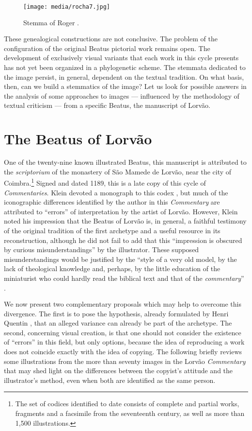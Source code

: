 \begin{paper}
\begin{figure}[H]
    \centering
    \texttt{[image: media/rocha7.jpg]}
    \caption{Stemma of Roger \citet{gryson_beati_2012}.}
    \label{fig:rocha:gryson}
\end{figure}

These genealogical constructions are not conclusive. The problem of the
configuration of the original Beatus pictorial work remains open. The
development of exclusively visual variants that each work in this cycle
presents has not yet been organized in a phylogenetic scheme. The
stemmata dedicated to the image persist, in general, dependent on
the textual tradition. On what basis, then, can we build a stemmatics of
the image? Let us look for possible answers in the analysis of some
approaches to images –– influenced by the methodology of textual
criticism –– from a specific Beatus, the manuscript of Lorvão.

\section*{The Beatus of Lorvão}

One of the twenty-nine known illustrated Beatus, this manuscript is
attributed to the \emph{scriptorium} of the monastery of São Mamede de
Lorvão, near the city of Coimbra.\footnote{The set of codices identified
  to date consists of complete and partial works, fragments and a
  facsimile from the seventeenth century, as well as more than 1,500
  illustrations.} Signed and dated 1189, this is a late copy of this
cycle of \emph{Commentaries}. Klein devoted a monograph to this codex \citep{klein_beato_2004}, but much of the iconographic differences identified by the
author in this \emph{Commentary} are attributed to ``errors'' of
interpretation by the artist of Lorvão. However, Klein noted his
impression that the Beatus of Lorvão is, in general, a faithful
testimony of the original tradition of the first archetype and a useful
resource in its reconstruction, although he did not fail to add that
this ``impression is obscured by curious misunderstandings'' \citep[42]{klein_beato_2004} by the illustrator. These supposed misunderstandings would be
justified by the ``style of a very old model, by the lack of theological
knowledge and, perhaps, by the little education of the miniaturist who
could hardly read the biblical text and that of the \emph{commentary}''
\citep[42]{klein_beato_2004}.

We now present two complementary proposals which may help to overcome
this divergence. The first is to pose the hypothesis, already formulated
by Henri Quentin \citeyearpar{quentin_essais_1926}, that an alleged variance can already be part of the archetype. The second, concerning visual creation, is that one
should not consider the existence of ``errors'' in this field, but only
options, because the idea of reproducing a work does not coincide
exactly with the idea of copying. The following briefly reviews some
illustrations from the more than seventy images in the Lorvão
\emph{Commentary} that may shed light on the differences between the
copyist's attitude and the illustrator's method, even when both are
identified as the same person.


\end{paper}
